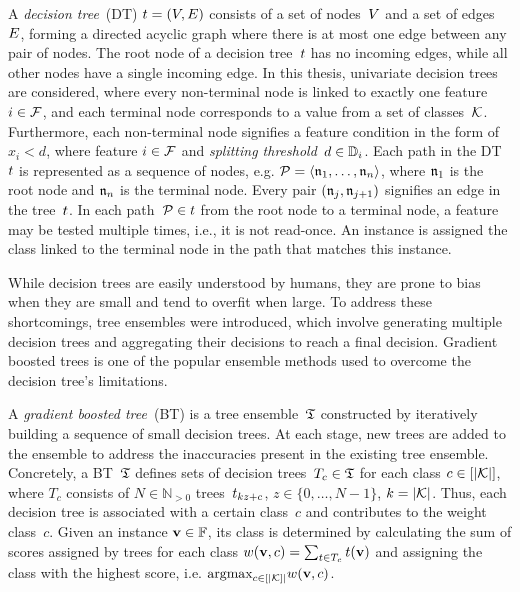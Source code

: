 A \emph{decision tree}~(DT) $t = (V, E)$ consists of a set of
nodes~$V$ and a set of edges~$E$,
forming a directed acyclic graph where there is at most one
edge between any pair of nodes.
%
The root node of a decision tree~$t$ has no incoming edges,
while all other nodes have a single incoming edge.
%
In this thesis, univariate decision trees are considered,
where every non-terminal node is linked to exactly
one feature $i \in {\mathcal{F}}$, and each terminal node
corresponds to a value from a set of classes~${\mathcal{K}}$.
%
Furthermore, each non-terminal node signifies a feature
condition in the form of $x_i < d$, where feature $i \in {\mathcal{F}}$
and \emph{splitting threshold}~$d \in \mathbb{D}_i$.
%
Each path in the DT~$t$ is represented as a sequence of nodes,
e.g. ${\mathcal{P}} = \langle \mathfrak{n}_1, \dots, \mathfrak{n}_n \rangle$,
where $\mathfrak{n}_1$ is the root node and $\mathfrak{n}_n$ is the terminal node.
%
Every pair $(\mathfrak{n}_j, \mathfrak{n}_{j+1})$ signifies an edge in the tree~$t$.
%
In each path~${\mathcal{P}} \in t$ from the root node to a terminal node,
a feature may be tested multiple times, i.e., it is not read-once.
%
An instance is assigned the class linked to the
terminal node in the path that matches this instance.


While decision trees are easily understood by humans,
they are prone to bias when they are small and tend to overfit
when large.
%
To address these shortcomings, tree ensembles were introduced,
which involve generating multiple decision trees and aggregating
their decisions to reach a final decision.
%
Gradient boosted trees is one of the popular ensemble methods used
to overcome the decision tree's limitations.

A \emph{gradient boosted tree}~(BT) is a tree ensemble~$\mathfrak{T}$
constructed by iteratively building a sequence of small
decision trees.
%
At each stage, new trees are added to the ensemble to address
the inaccuracies present in the existing tree ensemble.
%
Concretely, a BT~$\mathfrak{T}$ defines sets of decision trees~$T_{c} \in \mathfrak{T}$
for each class $c \in [|{\mathcal{K}}|]$, where $T_{c}$ consists of
$N \in \mathbb{N}_{>0}$ trees~$t_{kz+c}$,
$z \in \{0, \dots, N-1\}$, $k = |{\mathcal{K}}|$.
%
Thus, each decision tree is associated with a certain class~$c$
and contributes to the weight class~$c$.
%
Given an instance $\mathbf{v}\in\mathbb{F}$, its
class is determined by calculating the sum of scores assigned
by trees for each class $w(\mathbf{v},c) = \sum_{t \in T_{c}} t(\mathbf{v})$ and
assigning the class with the highest score, i.e. $\textrm{argmax}_{c \in
[|{\mathcal{K}}]|} w(\mathbf{v},c)$.


